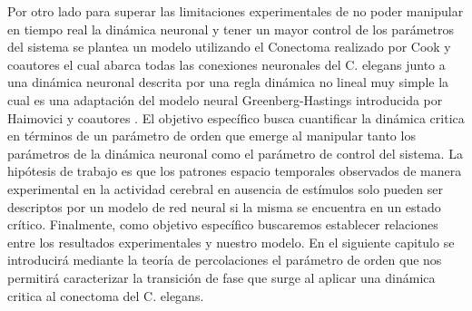 Por otro lado para superar las limitaciones experimentales de no poder manipular en tiempo real la dinámica neuronal y  tener un mayor control de los parámetros del sistema se plantea un modelo utilizando  el Conectoma  realizado por Cook y coautores  \cite{cook_whole-animal_2019} el cual abarca  todas las conexiones  neuronales  del C. elegans  junto a una  dinámica neuronal descrita por una regla dinámica no lineal muy simple la cual es una  adaptación del modelo neural Greenberg-Hastings introducida por Haimovici y coautores  \cite{haimovici_brain_2013}.   El  objetivo específico busca cuantificar la dinámica critica  en términos de un parámetro de orden   que emerge al manipular tanto los parámetros de  la dinámica neuronal  como el parámetro de control del sistema.  La hipótesis de trabajo es que los patrones espacio temporales observados de manera experimental en la actividad cerebral en ausencia de estímulos  solo pueden ser descriptos por un modelo de red neural si la misma se encuentra en un estado crítico. Finalmente, como objetivo específico buscaremos establecer relaciones entre los resultados experimentales y  nuestro modelo. En el siguiente capitulo se introducirá  mediante la teoría de percolaciones  el parámetro de orden que  nos permitirá caracterizar la transición de fase que surge al aplicar una dinámica critica al conectoma del C. elegans. 








